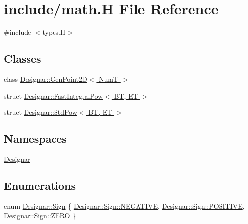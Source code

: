 \hypertarget{math_8_h}{}\section{include/math.H File Reference}
\label{math_8_h}
{\ttfamily \#include $<$types.\+H$>$}\newline
\subsection*{Classes}
\begin{DoxyCompactItemize}
\item 
class \hyperlink{class_designar_1_1_gen_point2_d}{Designar\+::\+Gen\+Point2\+D$<$ Num\+T $>$}
\item 
struct \hyperlink{struct_designar_1_1_fast_integral_pow}{Designar\+::\+Fast\+Integral\+Pow$<$ B\+T, E\+T $>$}
\item 
struct \hyperlink{struct_designar_1_1_std_pow}{Designar\+::\+Std\+Pow$<$ B\+T, E\+T $>$}
\end{DoxyCompactItemize}
\subsection*{Namespaces}
\begin{DoxyCompactItemize}
\item 
 \hyperlink{namespace_designar}{Designar}
\end{DoxyCompactItemize}
\subsection*{Enumerations}
\begin{DoxyCompactItemize}
\item 
enum \hyperlink{namespace_designar_aee82690b26e153ff9bcb37b8144b83f4}{Designar\+::\+Sign} \{ \hyperlink{namespace_designar_aee82690b26e153ff9bcb37b8144b83f4a50546bf973283065b6ccf09faf7a580a}{Designar\+::\+Sign\+::\+N\+E\+G\+A\+T\+I\+VE}, 
\hyperlink{namespace_designar_aee82690b26e153ff9bcb37b8144b83f4aab6c31432785221bae58327ef5f6ea58}{Designar\+::\+Sign\+::\+P\+O\+S\+I\+T\+I\+VE}, 
\hyperlink{namespace_designar_aee82690b26e153ff9bcb37b8144b83f4a529e9e0beb5f85d1f132917c1a09860c}{Designar\+::\+Sign\+::\+Z\+E\+RO}
 \}
\end{DoxyCompactItemize}
